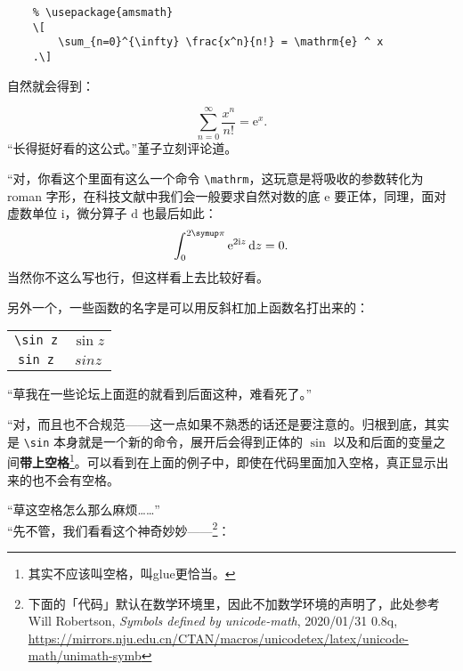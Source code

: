 {\begin{lstlisting}
    % \usepackage{amsmath}
    \[
        \sum_{n=0}^{\infty} \frac{x^n}{n!} = \mathrm{e} ^ x
    .\]
\end{lstlisting}

自然就会得到：



\[
    \sum_{n=0}^{\infty} \frac{x^n}{n!} = \mathrm{e} ^ x
    .\]
“长得挺好看的这公式。”堇子立刻评论道。

“对，你看这个里面有这么一个命令 \verb"\mathrm"，这玩意是将吸收的参数转化为 roman 字形，在科技文献中我们会一般要求自然对数的底 $\mathrm{e}$ 要正体，同理，面对虚数单位 $\mathrm{i}$，微分算子 $\mathrm{d}$ 也最后如此：
\[
    \int_0^{2\symup\pi } \mathrm{e} ^ {2 \mathrm{i} z } \,\mathrm{d}z = 0
    .\]
当然你不这么写也行，但这样看上去比较好看。

另外一个，一些函数的名字是可以用反斜杠加上函数名打出来的：

\begin{center}
    \begin{tabular}{cc}
        \verb"\sin z"    &    $\sin z$    \\
        \verb"sin z"     &    $sin z$     \\
    \end{tabular}
\end{center}

“草我在一些论坛上面逛的就看到后面这种，难看死了。”

“对，而且也不合规范——这一点如果不熟悉的话还是要注意的。归根到底，其实是 \verb"\sin" 本身就是一个新的命令，展开后会得到正体的 $\sin $ 以及和后面的变量之间\textbf{带上空格}\footnote{其实不应该叫空格，叫glue更恰当。}。可以看到在上面的例子中，即使在代码里面加入空格，真正显示出来的也不会有空格。

“草这空格怎么那么麻烦……”\\

“先不管，我们看看这个神奇妙妙——\footnote{下面的「代码」默认在数学环境里，因此不加数学环境的声明了，此处参考 Will Robertson, \textit{Symbols defined by unicode-math}, 2020/01/31
    0.8q, \url{https://mirrors.nju.edu.cn/CTAN/macros/unicodetex/latex/unicode-math/unimath-symb}}：


}
